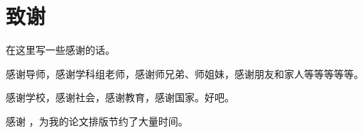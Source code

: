 
\chapter{致\hspace{1em}谢}

在这里写一些感谢的话。

感谢导师，感谢学科组老师，感谢师兄弟、师姐妹，感谢朋友和家人等等等等等。

感谢学校，感谢社会，感谢教育，感谢国家。好吧。

感谢 \sduthesis{}，为我的论文排版节约了大量时间。

